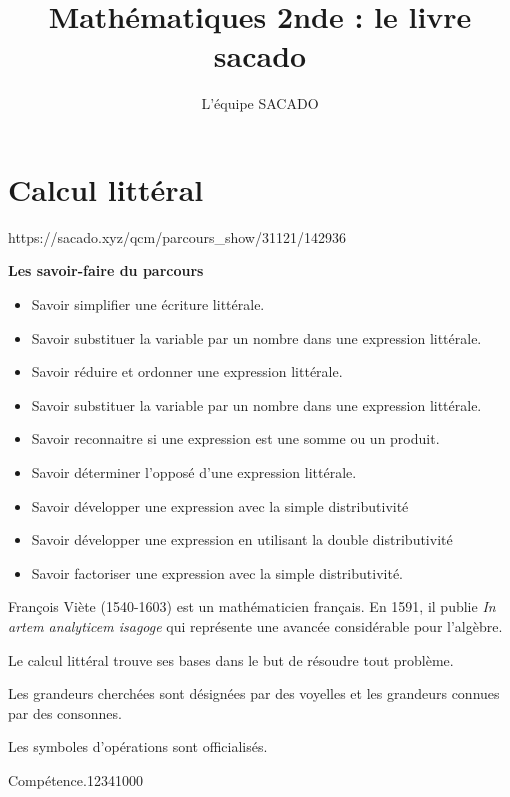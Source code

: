 



\title{Mathématiques 2nde  : le livre sacado}
\author{L'équipe SACADO}




\chapter{Calcul littéral}
{https://sacado.xyz/qcm/parcours_show/31121/142936}
{
 \begin{CpsCol}
	\textbf{Les savoir-faire du parcours}
 	\begin{itemize}
 		\item Savoir simplifier une écriture littérale.
		\item Savoir substituer la variable par un nombre dans une expression littérale.
		\item Savoir réduire et ordonner une expression littérale.
		\item Savoir substituer la variable par un nombre dans une expression littérale.
		\item Savoir reconnaitre si une expression est une somme ou un produit.
		\item Savoir déterminer l'opposé d'une expression littérale.
		\item Savoir développer une expression avec la simple distributivité
		\item Savoir développer une expression en utilisant la double distributivité
		\item Savoir factoriser une expression avec la simple distributivité.
 	\end{itemize}
 \end{CpsCol}

\begin{His}
François Viète (1540-1603) est un mathématicien français. En 1591, il publie \textit{In artem analyticem isagoge} qui représente une avancée considérable pour l'algèbre.

Le calcul littéral trouve ses bases dans le but de résoudre tout problème.

Les grandeurs cherchées sont désignées par des voyelles et les grandeurs connues par des consonnes.

Les symboles d'opérations sont officialisés.
\end{His}

\begin{ExoDec}{Compétence.}{1234}{1}{0}{0}{0}
\end{ExoDec}
}


